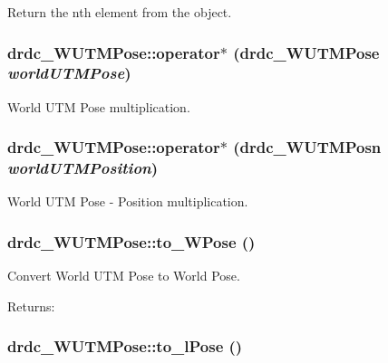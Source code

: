 Return the nth element from the object. 

\hypertarget{classdrdc__WUTMPose_d7fc2a0ccbee0f9042f0f5202deb7186}{
\subsubsection[operator$\ast$]{ drdc\_\-WUTMPose::operator$\ast$ ({\bf drdc\_\-WUTMPose} {\em worldUTMPose})}}
\label{classdrdc__WUTMPose_d7fc2a0ccbee0f9042f0f5202deb7186}


World UTM Pose multiplication. 

\hypertarget{classdrdc__WUTMPose_0e17522a504ad33eed8c6bb42ae2cac3}{
\subsubsection[operator$\ast$]{ drdc\_\-WUTMPose::operator$\ast$ ({\bf drdc\_\-WUTMPosn} {\em worldUTMPosition})}}
\label{classdrdc__WUTMPose_0e17522a504ad33eed8c6bb42ae2cac3}


World UTM Pose - Position multiplication. 

\hypertarget{classdrdc__WUTMPose_16b86001c3ee0e7b22cffcfdda270e06}{
\subsubsection[to\_\-WPose]{ drdc\_\-WUTMPose::to\_\-WPose ()}}
\label{classdrdc__WUTMPose_16b86001c3ee0e7b22cffcfdda270e06}


Convert World UTM Pose to World Pose. 

\begin{Desc}
\item[Returns:]\end{Desc}
\hypertarget{classdrdc__WUTMPose_9fe6b8c960457e26367848e82a00a37e}{
\subsubsection[to\_\-lPose]{ drdc\_\-WUTMPose::to\_\-lPose ()}}
\label{classdrdc__WUTMPose_9fe6b8c960457e26367848e82a00a37e}


